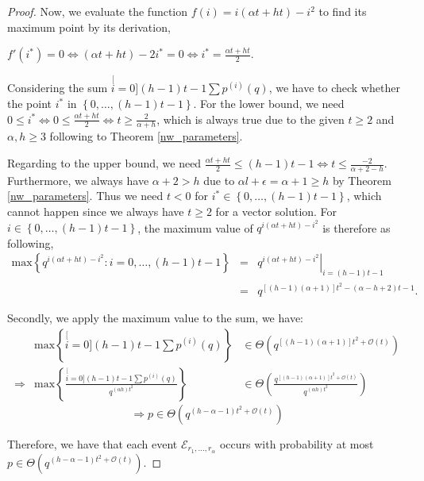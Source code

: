 \begin{proof}
Now, we evaluate the function $f(i)=i(\alpha t+ht)-i^{2}$ to find
its maximum point by its derivation, 

$f'(i^{*})=0\Leftrightarrow(\alpha t+ht)-2i^{*}=0\Leftrightarrow i^{*}=\frac{\alpha t+ht}{2}.$

Considering the sum $\stackrel[i=0]{(h-1)t-1}{\mathop{\sum}}p^{(i)}(q)$,
we have to check whether the point $i^{*}$ in $\left\{ 0,\ldots,(h-1)t-1\right\} $.
For the lower bound, we need $0\leq i^{*}\Leftrightarrow0\leq\frac{\alpha t+ht}{2}\Leftrightarrow t\geq\frac{2}{\alpha+h}$,
which is always true due to the given $t\geq2$ and $\alpha,h\geq3$
following to Theorem \ref{nw_parameters}.

Regarding to the upper bound, we need $\frac{\alpha t+ht}{2}\leq(h-1)t-1\Leftrightarrow t\leq\frac{-2}{\alpha+2-h}$.
Furthermore, we always have $\alpha+2>h$ due to $\alpha l+\epsilon=\alpha+1\geq h$
by Theorem \ref{nw_parameters}. Thus we need $t<0$ for $i^{*}\in\left\{ 0,\ldots,(h-1)t-1\right\} $,
which cannot happen since we always have $t\geq2$ for a vector solution.
For $i\in\left\{ 0,\ldots,(h-1)t-1\right\} $, the maximum value of
$q^{i(\alpha t+ht)-i^{2}}$ is therefore as following,
\begin{eqnarray*}
\mathrm{max}\left\{ q^{i(\alpha t+ht)-i^{2}}:i=0,\ldots,(h-1)t-1\right\}  & = & \left.q^{i(\alpha t+ht)-i^{2}}\right|_{i=(h-1)t-1}\\
 & = & q^{\left[\left(h-1\right)\left(\alpha+1\right)\right]t^{2}-\left(\alpha-h+2\right)t-1}.
\end{eqnarray*}

Secondly, we apply the maximum value to the sum, we have:
\begin{eqnarray*}
 & \mathrm{max}\left\{ \stackrel[i=0]{(h-1)t-1}{\mathop{\sum}}p^{(i)}(q)\right\}  & \in\Theta\left(q^{\left[\left(h-1\right)\left(\alpha+1\right)\right]t^{2}+\mathcal{O}(t)}\right)\\
\Rightarrow & \mathrm{max}\left\{ \frac{\stackrel[i=0]{(h-1)t-1}{\mathop{\sum}}p^{(i)}(q)}{q^{\left(\alpha h\right)t^{2}}}\right\}  & \in\Theta\left(\frac{q^{\left[\left(h-1\right)\left(\alpha+1\right)\right]t^{2}+\mathcal{O}(t)}}{q^{\left(\alpha h\right)t^{2}}}\right)
\end{eqnarray*}
\[
\Rightarrow p\in\Theta\left(q^{\left(h-\alpha-1\right)t^{2}+\mathcal{O}(t)}\right)
\]

Therefore, we have that each event $\mathcal{E}_{r_{1},\ldots,r_{\alpha}}$
 occurs with probability at most $p\in\Theta\left(q^{\left(h-\alpha-1\right)t^{2}+\mathcal{O}(t)}\right)$.
\end{proof}

